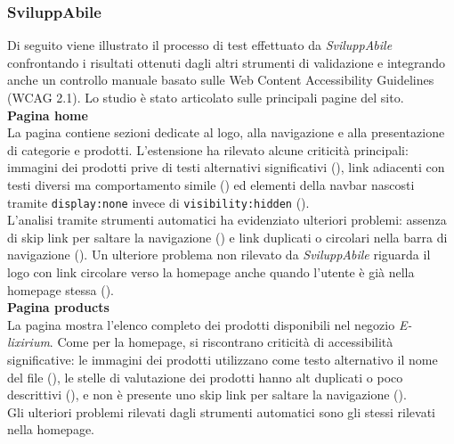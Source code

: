 \subsubsection{SviluppAbile}
\noindent Di seguito viene illustrato il processo di test effettuato da \textit{SviluppAbile} confrontando i risultati ottenuti dagli altri strumenti di validazione e integrando anche un controllo manuale basato sulle Web Content Accessibility Guidelines (WCAG 2.1). Lo studio è stato articolato sulle principali pagine del sito.\\

\noindent \textbf{Pagina home}\\
La pagina contiene sezioni dedicate al logo, alla navigazione e alla presentazione di categorie e prodotti. L’estensione ha rilevato alcune criticità principali: immagini dei prodotti prive di testi alternativi significativi ({}), link adiacenti con testi diversi ma comportamento simile ({}) ed elementi della navbar nascosti tramite \texttt{display:none} invece di \texttt{visibility:hidden} ({}).\\
L’analisi tramite strumenti automatici ha evidenziato ulteriori problemi: assenza di skip link per saltare la navigazione ({}) e link duplicati o circolari nella barra di navigazione ({}). Un ulteriore problema non rilevato da \textit{SviluppAbile} riguarda il logo con link circolare verso la homepage anche quando l’utente è già nella homepage stessa ({}).\\

\noindent \textbf{Pagina products}\\
La pagina mostra l’elenco completo dei prodotti disponibili nel negozio \textit{E-lixirium}. Come per la homepage, si riscontrano criticità di accessibilità significative: le immagini dei prodotti utilizzano come testo alternativo il nome del file ({}), le stelle di valutazione dei prodotti hanno alt duplicati o poco descrittivi ({}), e non è presente uno skip link per saltare la navigazione ({}).\\
Gli ulteriori problemi rilevati dagli strumenti automatici sono gli stessi rilevati nella homepage.\\

